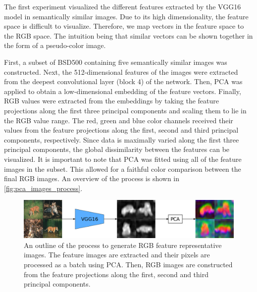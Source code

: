 The first experiment visualized the different features extracted by the VGG16 model in semantically similar images. Due to its high dimensionality, the feature space is difficult to visualize. Therefore, we map vectors in the feature space to the RGB space. The intuition being that similar vectors can be shown together in the form of a pseudo-color image.


First, a subset of BSD500 containing five semantically similar images was constructed. Next, the 512-dimensional features of the images were extracted from the deepest convolutional layer (block 4) of the network. Then, PCA was applied to obtain a low-dimensional embedding of the feature vectors. Finally, RGB values were extracted from the embeddings by taking the feature projections along the first three principal components and scaling them to lie in the RGB value range. The red, green and blue color channels received their values from the feature projections along the first, second and third principal components, respectively. Since data is maximally varied along the first three principal components, the global dissimilarity between the features can be visualized. It is important to note that PCA was fitted using all of the feature images in the subset. This allowed for a faithful color comparison between the final RGB images. An overview of the process is shown in \autoref{fig:pca_images_process}.

\begin{figure}[t]
    \centering

    \includegraphics[width=.9\textwidth]{figures/pca_images_process.pdf}
    \caption{An outline of the process to generate RGB feature representative images. The feature images are extracted and their pixels are processed as a batch using PCA. Then, RGB images are constructed from the feature projections along the first, second and third principal components.}
    \label{fig:pca_images_process}
\end{figure}

